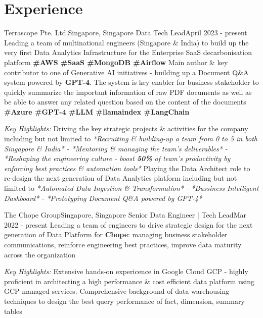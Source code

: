 \section{Experience}
  \resumeSubHeadingListStart
    
    \resumeSubheading
      {Terrascope Pte. Ltd.}{Singapore, Singapore}
      {Data Tech Lead}{April 2023 - present}
      \resumeItemListStart
          {Leading a team of multinational engineers (Singapore \& India) to build up the very first Data Analytics Infrastructure for the Enterprise SaaS decarbonisation platform \textbf{\scriptsize{\#AWS \#SaaS \#MongoDB \#Airflow}}}
          {Main author \& key contributor to one of Generative AI initiatives - building up a Document Q\&A system powered by \textbf{GPT-4}. The system is key enabler for business stakeholder to quickly summarize the important information of raw PDF documents as well as be able to answer any related question based on the content of the documents \textbf{\scriptsize{\#Azure \#GPT-4 \#LLM \#llamaindex \#LangChain}}}
      \resumeItemListEnd
      
      \emph{Key Highlights:}
      \resumeItemListStart
          {Driving the key strategic projects \& activities for the company including but not limited to \emph{*Recruiting \& building-up a team from 0 to 5 in both Singapore \& India* - *Mentoring \& managing the team's deliverables* - *Reshaping the engineering culture - boost \textbf{50\%} of team's productivity by enforcing best practices \& automation tools*}}
          {Playing the Data Architect role to re-design the next generation of Data Analytics platform including but not limited to \emph{*Automated Data Ingestion \& Transformation* - *Bussiness Intelligent Dashboard* - *Prototyping Document Q\&A powered by GPT-4*}}
      \resumeItemListEnd

    \resumeSubheading
      {The Chope Group}{Singapore, Singapore}
      {Senior Data Engineer | Tech Lead}{Mar 2022 - present}
      \resumeItemListStart
          {Leading a team of engineers to drive strategic design for the next generation of Data Platform  for \textbf{Chope}: managing business stakeholder communications, reinforce engineering best practices, improve data maturity across the organization}
      \resumeItemListEnd
      
      \emph{Key Highlights:}
      \resumeItemListStart
          {Extensive hands-on expericence in Google Cloud GCP - highly proficient in architecting a high performance \& cost efficient data platform using GCP managed services.}
          {Comprehensive background of data warehousing techniques to design the best query performance of fact, dimension, summary tables}
      \resumeItemListEnd

